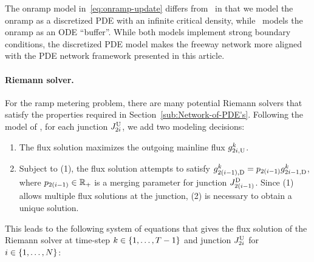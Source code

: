 The onramp model in~\eqref{eq:onramp-update} differs from~\cite{Monache2013,Walid}
in that we model the onramp as a discretized PDE with an infinite
critical density, while~\cite{Monache2013,Walid} models the onramp
as an ODE ``buffer''. While both models implement strong boundary
conditions, the discretized PDE model makes the freeway network more
aligned with the PDE network framework presented in this article.


\paragraph{Riemann solver.}

For the ramp metering problem, there are many potential Riemann solvers
that satisfy the properties required in Section~\ref{sub:Network-of-PDE's}.
Following the model of \cite{Walid,ML}, for each junction $J_{2i}^{\text{U}}$,
we add two modeling decisions:
\begin{enumerate}
\item The flux solution maximizes the outgoing mainline flux $g_{2i,\text{U}}^{k}$.
\item Subject to (1), the flux solution attempts to satisfy $\fout{2\left(\link-1\right)}{\tind}=p_{2(\link-1)}\fout{2\link-1}{\tind}$,
where $p_{2(i-1)}\in\mathbb{R}_{+}$ is a merging parameter for
junction $\jdown{2\left(\link-1\right)}$. Since (1) allows multiple
flux solutions at the junction, (2) is necessary to obtain a unique
solution.
\end{enumerate}
This leads to the following system of equations that gives the flux
solution of the Riemann solver at time-step $k\in\intrange 1{\ntime-1}$
and junction $J_{2i}^{\text{U}}$ for $\link\in\intrange 1{\nlinks}$:

